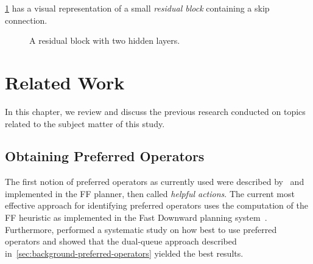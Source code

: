 \documentclass[ppgc,diss,english]{iiufrgs}
\begin{document}
\cref{fig:residual-block} has a visual representation of a small \emph{residual block} containing a skip connection.

\begin{figure}[ht]
\caption{A residual block with two hidden layers.}
\vspace{\baselineskip}
\centering
{}
\label{fig:residual-block}
\end{figure}


\chapter{Related Work}
\label{cha:related-work}
In this chapter, we review and discuss the previous research conducted on topics related to the subject matter of this study.

\section{Obtaining Preferred Operators}
\label{sec:related-pos}
The first notion of preferred operators as currently used were described by~\citet{Hoffmann.Nebel/2001} and implemented in the FF planner, then called \emph{helpful actions}. The current most effective approach for identifying preferred operators uses the computation of the FF heuristic as implemented in the Fast Downward planning system~\cite{Helmert/2006}.
Furthermore, \citet{Richter.Helmert/2009} performed a systematic study on how best to use preferred operators and showed that the dual-queue approach described in~\cref{sec:background-preferred-operators} yielded the best results.
\end{document}
